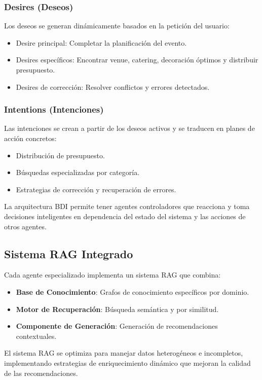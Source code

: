 \documentclass[runningheads,a4paper]{llncs}
\begin{document}
\subsubsection{Desires (Deseos)}
Los deseos se generan dinámicamente basados en la petición del usuario:
\begin{itemize}
    \item Desire principal: Completar la planificación del evento.
    \item Desires específicos: Encontrar venue, catering, decoración óptimos y distribuir presupuesto.
    \item Desires de corrección: Resolver conflictos y errores detectados.
\end{itemize}

\subsubsection{Intentions (Intenciones)}
Las intenciones se crean a partir de los deseos activos y se traducen en planes de acción concretos:
\begin{itemize}
    \item Distribución de presupuesto.
    \item Búsquedas especializadas por categoría.
    \item Estrategias de corrección y recuperación de errores.
\end{itemize}

La arquitectura BDI permite tener agentes controladores que reacciona y toma decisiones inteligentes en dependencia del 
estado del sistema y las acciones de otros agentes.

\subsection{Sistema RAG Integrado}

Cada agente especializado implementa un sistema RAG que combina:

\begin{itemize}
    \item \textbf{Base de Conocimiento}: Grafos de conocimiento específicos por dominio.
    \item \textbf{Motor de Recuperación}: Búsqueda semántica y por similitud.
    \item \textbf{Componente de Generación}: Generación de recomendaciones contextuales.
\end{itemize}

El sistema RAG se optimiza para manejar datos heterogéneos e incompletos, implementando estrategias de enriquecimiento 
dinámico que mejoran la calidad de las recomendaciones.
\end{document}
